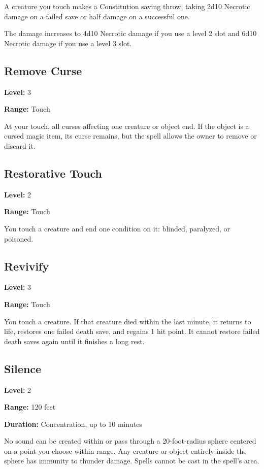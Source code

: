 \documentclass[12pt,letterpaper,twocolumn,openany,nodeprecatedcode,bg=none]{dndbook}
\let\oldsubsection\subsection
\renewcommand{\subsection}[1]{%
  \needspace{5\baselineskip}%
  \oldsubsection{#1}%
}
\begin{document}
A creature you touch makes a Constitution saving throw, taking 2d10
Necrotic damage on a failed save or half damage on a successful one.

The damage increases to 4d10 Necrotic damage if you use a level 2 slot
and 6d10 Necrotic damage if you use a level 3 slot.

\newpage

\subsection{Remove Curse}\label{remove-curse}

\textbf{Level:} 3

\textbf{Range:} Touch

At your touch, all curses affecting one creature or object end. If the
object is a cursed magic item, its curse remains, but the spell allows
the owner to remove or discard it.

\subsection{Restorative Touch}\label{restorative-touch}

\textbf{Level:} 2

\textbf{Range:} Touch

You touch a creature and end one condition on it: blinded, paralyzed, or
poisoned.

\subsection{Revivify}\label{revivify}

\textbf{Level:} 3

\textbf{Range:} Touch

You touch a creature. If that creature died within the last minute, it
returns to life, restores one failed death save, and regains 1 hit
point. It cannot restore failed death saves again until it finishes a
long rest.

\subsection{Silence}\label{silence}

\textbf{Level:} 2

\textbf{Range:} 120 feet

\textbf{Duration:} Concentration, up to 10 minutes

No sound can be created within or pass through a 20-foot-radius sphere
centered on a point you choose within range. Any creature or object
entirely inside the sphere has immunity to thunder damage. Spells cannot
be cast in the spell's area.
\end{document}
